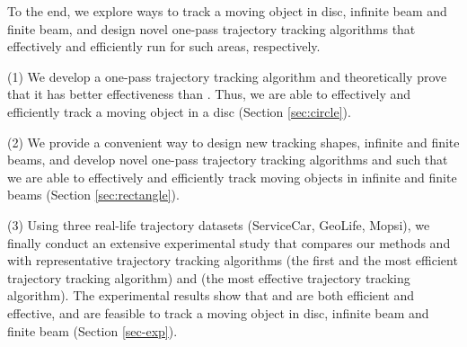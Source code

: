 To the end, we explore ways to track a moving object in disc, infinite beam and finite beam, and design novel one-pass trajectory tracking algorithms that effectively and efficiently run for such areas, respectively. 

\ni (1) We develop a one-pass trajectory tracking algorithm \citt and theoretically prove that it has better effectiveness than \ldrh. Thus, we are able to effectively and efficiently track a moving object in a disc (Section \ref{sec:circle}).


\ni (2) We provide a convenient way to design new tracking shapes, \ie  infinite and finite beams, and develop novel one-pass trajectory tracking algorithms \sitt and \bitt such that we are able to effectively and efficiently track moving objects in infinite and finite beams (Section \ref{sec:rectangle}). 

\ni (3) Using three real-life trajectory datasets (ServiceCar, GeoLife, Mopsi), we finally conduct an extensive experimental study that compares our methods \citt and \bitt with representative trajectory tracking algorithms \ldrh (the first and the most efficient trajectory tracking algorithm) and \grts (the most effective trajectory tracking algorithm). The experimental results show that \citt and \bitt are both efficient and effective, and are feasible to track a moving object in disc, infinite beam and finite beam (Section \ref{sec-exp}).




